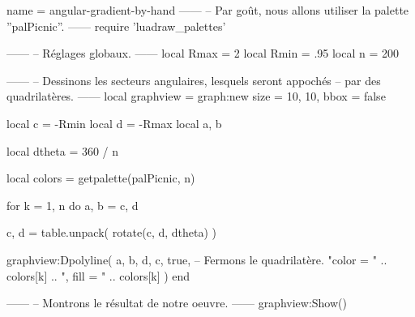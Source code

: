\documentclass{standalone}
\begin{document}
\begin{luadraw*}{name = angular-gradient-by-hand}
------
-- Par goût, nous allons utiliser la palette ''palPicnic''.
------
require 'luadraw_palettes'

------
-- Réglages globaux.
------
local Rmax = 2
local Rmin = .95
local n    = 200

------
-- Dessinons les secteurs angulaires, lesquels seront appochés
-- par des quadrilatères.
------
local graphview = graph:new{
  size = {10, 10},
  bbox = false
}

local c = -Rmin
local d = -Rmax
local a, b

local dtheta = 360 / n

local colors = getpalette(palPicnic, n)

for k = 1, n do
  a, b = c, d

  c, d = table.unpack(
    rotate({c, d}, dtheta)
  )

  graphview:Dpolyline(
    {a, b, d, c},
    true,           -- Fermons le quadrilatère.
      "color = "
    .. colors[k]
    .. ", fill = "
    .. colors[k]
  )
end

------
-- Montrons le résultat de notre oeuvre.
------
graphview:Show()
\end{luadraw*}
\end{document}
